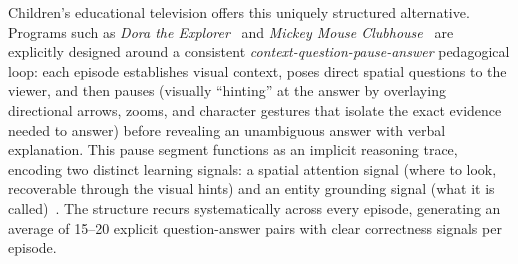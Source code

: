 \documentclass{article}
\begin{document}


Children's educational television offers this uniquely structured alternative. Programs such as \textit{Dora the Explorer}~\cite{dora_explorer} and \textit{Mickey Mouse Clubhouse}~\cite{gannaway2006mmclubhouse} are explicitly designed around a consistent \textit{context-question-pause-answer} pedagogical loop: each episode establishes visual context, poses direct spatial questions to the viewer, and then pauses (visually ``hinting'' at the answer by overlaying directional arrows, zooms, and character gestures that isolate the exact evidence needed to answer) before revealing an unambiguous answer with verbal explanation. This pause segment functions as an implicit reasoning trace, encoding two distinct learning signals: a spatial attention signal (where to look, recoverable through the visual hints) and an entity grounding signal (what it is called)~\cite{pozzulo2012culprit}. The structure recurs systematically across every episode, generating an average of 15--20 explicit question-answer pairs with clear correctness signals per episode.
\end{document}
